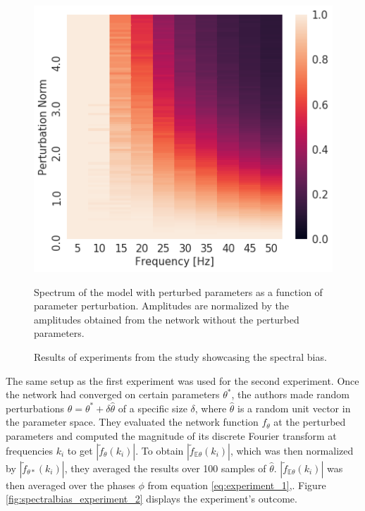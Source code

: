 \begin{figure}[ht]
\begin{subcaptionblock}[t]{.475\textwidth}
        \includegraphics[height=0.9\textwidth]{images/experiment_2.png}
        \caption[Experiment showing robustness to parameter perturbation]{\label{fig:spectralbias_experiment_2}Spectrum of the model with perturbed parameters as a function of parameter perturbation. Amplitudes are normalized by the amplitudes obtained from the network without the perturbed parameters. \cite{spectralbias}}
    \end{subcaptionblock}
    \caption[Results of experiments showcasing the spectral bias]{\label{fig:spectralbias_experiments}Results of experiments from the study \cite{spectralbias} showcasing the spectral bias.}
\end{figure}

The same setup as the first experiment was used for the second experiment. Once the network had converged on certain parameters $\theta^{*}$, the authors made random perturbations $\theta = \theta^{*} + \delta \hat{\theta}$ of a specific size $\delta$, where $\hat{\theta}$ is a random unit vector in the parameter space. They evaluated the network function $f_{\theta}$ at the perturbed parameters and computed the magnitude of its discrete Fourier transform at frequencies $k_i$ to get $|\tilde{f}_{\theta}({k_i})|$. To obtain $|\tilde{f}_{\mathbb{E}\theta}({k_i})|$, which was then normalized by $|\tilde{f}_{\theta*}({k_i})|$, they averaged the results over 100 samples of $\hat{\theta}$. $|\tilde{f}_{\mathbb{E}\theta}({k_i})|$ was then averaged over the phases $\phi$ from equation \ref{eq:experiment_1},. Figure \ref{fig:spectralbias_experiment_2} displays the experiment's outcome. \cite{spectralbias}


